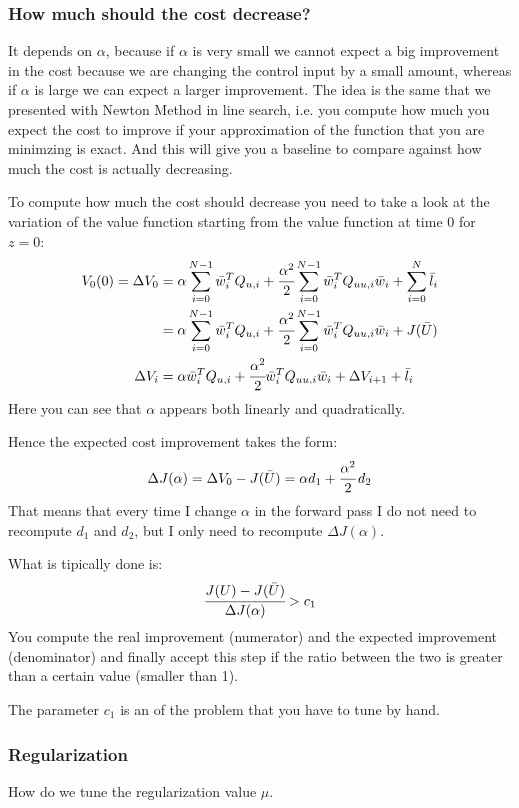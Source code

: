 \subsubsection{How much should the cost decrease?}

It depends on $\alpha$, because if $\alpha$ is very small we cannot expect a big improvement in the cost because we are changing the control input by a small amount, whereas if $\alpha$ is large we can expect a larger improvement.
The idea is the same that we presented with Newton Method in line search, i.e. you compute how much you expect the cost to improve if your approximation of the function that you are minimzing is exact. And this will give you a baseline to compare against how much the cost is actually decreasing.

To compute how much the cost should decrease you need to take a look at the variation of the value function starting from the value function at time 0 for $z = 0$:
\begin{align*}
V_0(0) = \Delta V_0 &= \alpha \sum_{i=0}^{N-1}\bar{w}_i^T Q_{u,i} + \cfrac{\alpha^2}{2} \sum_{i=0}^{N-1}\bar{w}_i^TQ_{uu,i}\bar{w}_i + \sum_{i=0}^N\bar{l}_i\\
&=\alpha \sum_{i=0}^{N-1}\bar{w}_i^T Q_{u,i} + \cfrac{\alpha^2}{2} \sum_{i=0}^{N-1}\bar{w}_i^TQ_{uu,i}\bar{w}_i + J(\bar{U})\\
\Delta V_i &= \alpha \bar{w}_i^T Q_{u,i} + \cfrac{\alpha^2}{2}\bar{w}_i^T Q_{uu,i} \bar{w}_i + \Delta V_{i+1} + \bar{l}_i
\end{align*}
Here you can see that $\alpha$ appears both linearly  and quadratically.

Hence the expected cost improvement takes the form:
\[\Delta J(\alpha) = \Delta V_{0} - J(\bar{U})=\alpha d_1 + \cfrac{\alpha^2}{2}\,d_2\]
That means that every time I change $\alpha$ in the forward pass I do not need to recompute $d_1$ and $d_2$, but I only need to recompute $\Delta J(\alpha)$.

What is tipically done is:
\[\cfrac{J(U) - J(\bar{U})}{\Delta J(\alpha)}>c_1\]
You compute the real improvement (numerator) and the expected improvement (denominator) and finally accept this step if the ratio between the two is greater than a certain value (smaller than 1).

The parameter $c_1$ is an  of the problem that you have to tune by hand.

\subsubsection{Regularization}
How do we tune the regularization value $\mu$.

